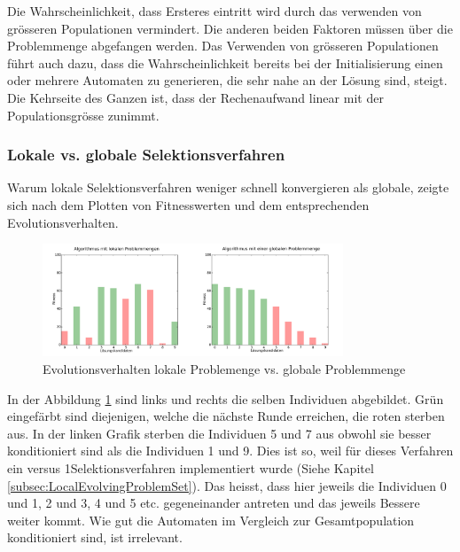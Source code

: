 Die Wahrscheinlichkeit, dass Ersteres eintritt wird durch das verwenden von grösseren Populationen vermindert. Die anderen beiden Faktoren müssen über die Problemmenge abgefangen werden. Das Verwenden von grösseren Populationen führt auch dazu, dass die Wahrscheinlichkeit bereits bei der Initialisierung einen oder mehrere Automaten zu generieren, die sehr nahe an der Lösung sind, steigt. Die Kehrseite des Ganzen ist, dass der Rechenaufwand linear mit der Populationsgrösse zunimmt.

\subsubsection{Lokale vs. globale Selektionsverfahren}
Warum lokale Selektionsverfahren weniger schnell konvergieren als globale, zeigte sich nach dem Plotten von Fitnesswerten und dem entsprechenden Evolutionsverhalten.

\begin{figure}[ht]
  \centering
  \includegraphics[width=0.8\textwidth]{images/evolutionsverhalten_lokal_vs_global.pdf}
  \caption[Evolutionsverhalten lokale Problemenge vs. globale Problemmenge]{Evolutionsverhalten lokale Problemenge vs. globale Problemmenge}
  \label{fig:evolutionsverhalten_lokal_vs_global}
\end{figure}

In der Abbildung \ref{fig:evolutionsverhalten_lokal_vs_global} sind links und rechts die selben Individuen abgebildet. Grün eingefärbt sind diejenigen, welche die nächste Runde erreichen, die roten sterben aus. In der linken Grafik sterben die Individuen 5 und 7 aus obwohl sie besser konditioniert sind als die Individuen 1 und 9. Dies ist so, weil für dieses Verfahren ein  versus 1\frqq Selektionsverfahren implementiert wurde (Siehe Kapitel \ref{subsec:LocalEvolvingProblemSet}). Das heisst, dass hier jeweils die Individuen 0 und 1, 2 und 3, 4 und 5 etc. gegeneinander antreten und das jeweils Bessere weiter kommt. Wie gut die Automaten im Vergleich zur Gesamtpopulation konditioniert sind, ist irrelevant.
